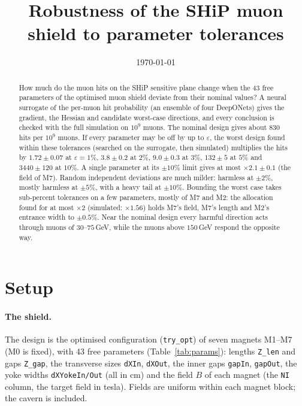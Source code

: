 \documentclass[11pt,a4paper]{article}
\title{Robustness of the SHiP muon shield to parameter tolerances}
\author{}
\date{\today}
\begin{document}
\maketitle

\begin{abstract}
How much do the muon hits on the SHiP sensitive plane change when the 43 free parameters of the
optimised muon shield deviate from their nominal values? A neural surrogate of the per-muon hit
probability (an ensemble of four DeepONets) gives the gradient, the Hessian and candidate
worst-case directions, and every conclusion is checked with the full simulation on $10^9$
muons. The nominal design gives about $830$ hits per $10^9$ muons. If every parameter may be off
by up to $\varepsilon$, the worst design found within these tolerances (searched on the surrogate,
then simulated) multiplies the hits by $1.72\pm0.07$ at $\varepsilon=1\%$, $3.8\pm0.2$ at $2\%$,
$9.0\pm0.3$ at $3\%$, $132\pm5$ at $5\%$ and $3440\pm120$ at $10\%$. A single parameter at
its $\pm10\%$ limit gives at most $\times2.1\pm0.1$ (the field of M7). Random independent
deviations are much milder: harmless at $\pm2\%$, mostly harmless at $\pm5\%$, with a heavy
tail at $\pm10\%$. Bounding the worst case takes sub-percent tolerances on a few parameters,
mostly of M7 and M2: the allocation found for at most $\times2$ (simulated: $\times1.56$) holds
M7's field, M7's length and M2's entrance width to $\pm0.5\%$. Near the nominal design every
harmful direction acts through muons of $30$--$75$\,GeV, while the muons above $150$\,GeV respond
the opposite way.
\end{abstract}

\tableofcontents

\section{Setup}

\paragraph{The shield.}
The design is the optimised configuration (\texttt{try\_opt}) of seven magnets M1--M7 (M0 is
fixed), with 43 free parameters (Table~\ref{tab:params}): lengths \texttt{Z\_len} and gaps
\texttt{Z\_gap}, the transverse sizes \texttt{dXIn}, \texttt{dXOut}, the inner gaps
\texttt{gapIn}, \texttt{gapOut}, the yoke widths \texttt{dXYokeIn/Out} (all in cm) and the field
$B$ of each magnet (the \texttt{NI} column, the target field in tesla). Fields are uniform within
each magnet block; the cavern is included.
\end{document}
